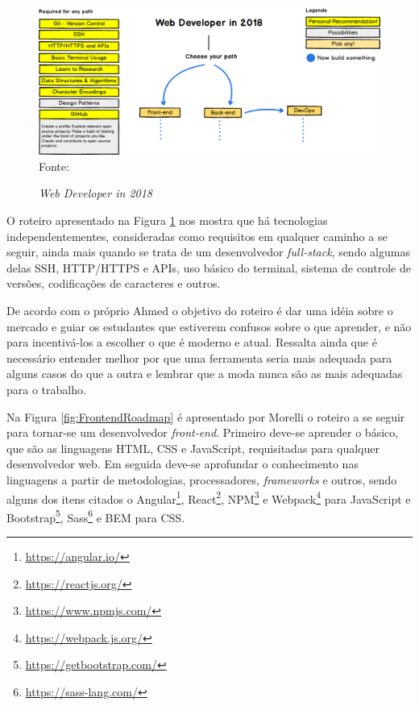 \documentclass[
	12pt,				%
	openright,			%
	twoside,			%
	a4paper,			%
	english,			%
	brazil				%
	]{abntex2}
\begin{document}
\begin{figure}[h]
	\centering

	\caption{\textit{Web Developer in 2018}} \label{fig:FullstackRoadmap}
    \includegraphics[scale=0.4]{fullstack-roadmap} \\
    Fonte: {\cite{ahmedse_roadmap}}

\end{figure}

O roteiro apresentado na Figura \ref{fig:FullstackRoadmap} nos mostra que há tecnologias independentementes, consideradas como requisitos em qualquer caminho a se seguir, ainda mais quando se trata de um desenvolvedor \textit{full-stack}, sendo algumas delas SSH, HTTP/HTTPS e APIs, uso básico do terminal, sistema de controle de versões, codificações de caracteres e outros.

De acordo com o próprio Ahmed\cite{ahmedse_roadmap} o objetivo do roteiro é dar uma idéia sobre o mercado e guiar os estudantes que estiverem confusos sobre o que aprender, e não para incentivá-los a escolher o que é moderno e atual. Ressalta ainda que é necessário entender melhor por que uma ferramenta seria mais adequada para alguns casos do que a outra e lembrar que a moda nunca são as mais adequadas para o trabalho.

Na Figura \ref{fig:FrontendRoadmap} é apresentado por Morelli\cite{morelli_roadmap} o roteiro a se seguir para tornar-se um desenvolvedor \textit{front-end}. Primeiro deve-se aprender o básico, que são as linguagens HTML, CSS e JavaScript, requisitadas para qualquer desenvolvedor web. Em seguida deve-se aprofundar o conhecimento nas linguagens a partir de metodologias, processadores, \textit{frameworks} e outros, sendo alguns dos itens citados o Angular\footnote{\url{https://angular.io/}}, React\footnote{\url{https://reactjs.org/}}, NPM\footnote{\url{https://www.npmjs.com/}} e Webpack\footnote{\url{https://webpack.js.org/}} para JavaScript e Bootstrap\footnote{\url{https://getbootstrap.com/}}, Sass\footnote{\url{https://sass-lang.com/}} e BEM para CSS.
\end{document}
